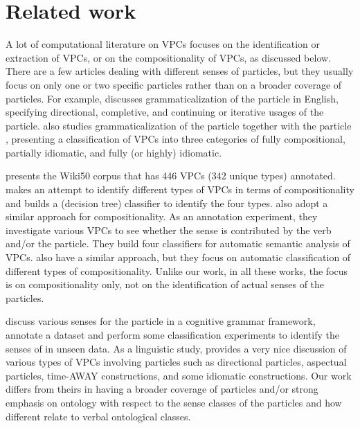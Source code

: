 \documentclass[output=paper,modfonts,nonflat]{langsci/langscibook}
\begin{document}
\section{Related work} \label{sec:prevwork}
A lot of computational literature on VPCs focuses on the identification or extraction of VPCs, or on the compositionality of VPCs, as discussed below. There are a few articles dealing with different senses of particles, but they usually focus on only one or two specific particles rather than on a broader coverage of particles. For example, \citet{Nii14} discusses grammaticalization of the particle  in English, specifying directional, completive, and continuing or iterative usages of the particle. \citet{Ish10,Ish12} also studies grammaticalization of the particle  together with the particle , presenting a classification of VPCs into three categories of fully compositional, partially idiomatic, and fully (or highly) idiomatic. 

\citet{wiki50} presents the Wiki50 corpus that has 446 VPCs (342 unique types) annotated. \citet{Ban02} makes an attempt to identify different types of VPCs in terms of compositionality and builds a (decision tree) classifier to identify the four types. \citet{Ban03} also adopt a similar approach for compositionality. As an annotation experiment, they investigate various VPCs to see whether the sense is contributed by the verb and/or the particle. They build four classifiers for automatic semantic analysis of VPCs. \citet{Pat04} also have a similar approach, but they focus on automatic classification of different types of compositionality. Unlike our work, in all these works, the focus is on compositionality only, not on the identification of actual senses of the particles.

\citet{Coo06} discuss various senses for the particle  in a cognitive grammar framework, annotate a dataset and perform some classification experiments to identify the senses of  in unseen data. As a linguistic study, \citet{Jac02} provides a very nice discussion of various types of VPCs involving particles such as directional particles, aspectual particles, time-AWAY constructions, and some idiomatic constructions. Our work differs from theirs in having a broader coverage of particles and/or strong emphasis on ontology with respect to the sense classes of the particles and how different  relate to verbal ontological classes.
\end{document}
